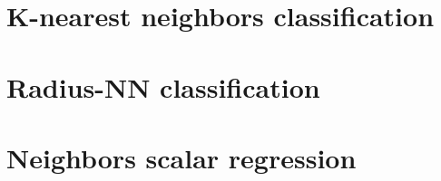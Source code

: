 




\section{K-nearest neighbors classification\label{EX:KNN}}
\section{Radius-NN classification\label{EX:RNN}}
\section{Neighbors scalar regression\label{EX:SCALARREG}}